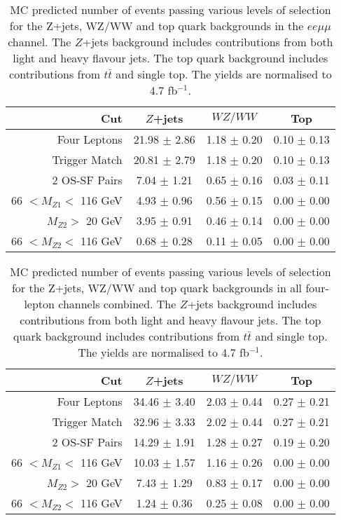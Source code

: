 \begin{table}[htbp]
  \centering
  \begin{tabular}{r|c|c|c} 
    \hline\hline
                 Cut &               $Z$+jets &             $WZ/WW$ &               Top\\ 
    \hline
        Four Leptons &  21.98 $\pm$ 2.86 & 1.18 $\pm$ 0.20 & 0.10 $\pm$ 0.13 \\ 
       Trigger Match &  20.81 $\pm$ 2.79 & 1.18 $\pm$ 0.20 & 0.10 $\pm$ 0.13 \\ 
       2 OS-SF Pairs &  7.04 $\pm$ 1.21 & 0.65 $\pm$ 0.16 & 0.03 $\pm$ 0.11 \\ 
66 $ < M_{Z1} < $ 116 GeV &  4.93 $\pm$ 0.96 & 0.56 $\pm$ 0.15 & 0.00 $\pm$ 0.00 \\ 
  $M_{Z2} > $ 20 GeV &  3.95 $\pm$ 0.91 & 0.46 $\pm$ 0.14 & 0.00 $\pm$ 0.00 \\ 
66 $ < M_{Z2} < $ 116 GeV &  0.68 $\pm$ 0.28 & 0.11 $\pm$ 0.05 & 0.00 $\pm$ 0.00 \\ 
    \hline\hline
  \end{tabular}
  \caption{MC predicted number of events passing various levels of selection for the Z+jets, WZ/WW and top quark backgrounds in the $ee\mu\mu$ channel. The $Z$+jets background includes contributions from both light and heavy flavour jets. The top quark background includes contributions from $t\bar t$ and single top. The yields are normalised to 4.7 fb$^{-1}$.
}
  \label{table:mc-bg-2e2mu}
\end{table}

\begin{table}[htbp]
  \centering
  \begin{tabular}{r|c|c|c} 
    \hline\hline
                 Cut &               $Z$+jets &             $WZ/WW$ &               Top\\ 
    \hline
        Four Leptons &  34.46 $\pm$ 3.40 & 2.03 $\pm$ 0.44 & 0.27 $\pm$ 0.21 \\ 
       Trigger Match &  32.96 $\pm$ 3.33 & 2.02 $\pm$ 0.44 & 0.27 $\pm$ 0.21 \\ 
       2 OS-SF Pairs &  14.29 $\pm$ 1.91 & 1.28 $\pm$ 0.27 & 0.19 $\pm$ 0.20 \\ 
66 $ < M_{Z1} < $ 116 GeV &  10.03 $\pm$ 1.57 & 1.16 $\pm$ 0.26 & 0.00 $\pm$ 0.00 \\ 
  $M_{Z2} > $ 20 GeV &  7.43 $\pm$ 1.29 & 0.83 $\pm$ 0.17 & 0.00 $\pm$ 0.00 \\ 
66 $ < M_{Z2} < $ 116 GeV &  1.24 $\pm$ 0.36 & 0.25 $\pm$ 0.08 & 0.00 $\pm$ 0.00 \\ 
    \hline\hline
  \end{tabular}
  \caption{MC predicted number of events passing various levels of selection for the Z+jets, WZ/WW and top quark backgrounds in all four-lepton channels combined. The $Z$+jets background includes contributions from both light and heavy flavour jets. The top quark background includes contributions from $t\bar t$ and single top. The yields are normalised to 4.7 fb$^{-1}$.
}
  \label{table:mc-bg-4l}
\end{table}

